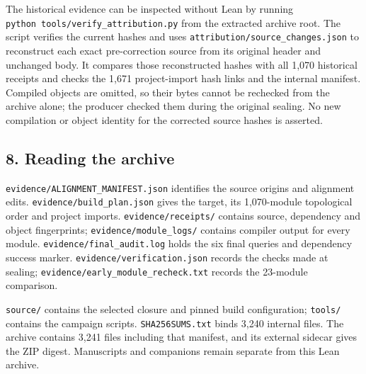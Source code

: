 \documentclass[english,11pt,a4paper]{article}
\begin{document}
The historical evidence can be inspected without Lean by running \texttt{python\ tools/\allowbreak{}verify\_\allowbreak{}attribution.\allowbreak{}py} from the extracted archive root. The script verifies the current hashes and uses \texttt{attribution/\allowbreak{}source\_\allowbreak{}changes.\allowbreak{}json} to reconstruct each exact pre-correction source from its original header and unchanged body. It compares those reconstructed hashes with all 1,070 historical receipts and checks the 1,671 project-import hash links and the internal manifest. Compiled objects are omitted, so their bytes cannot be rechecked from the archive alone; the producer checked them during the original sealing. No new compilation or object identity for the corrected source hashes is asserted.

\subsection{8. Reading the archive}\label{reading-the-archive}

\texttt{evidence/\allowbreak{}ALIGNMENT\_\allowbreak{}MANIFEST.\allowbreak{}json} identifies the source origins and alignment edits. \texttt{evidence/\allowbreak{}build\_\allowbreak{}plan.\allowbreak{}json} gives the target, its 1,070-module topological order and project imports. \texttt{evidence/\allowbreak{}receipts/\allowbreak{}} contains source, dependency and object fingerprints; \texttt{evidence/\allowbreak{}module\_\allowbreak{}logs/\allowbreak{}} contains compiler output for every module. \texttt{evidence/\allowbreak{}final\_\allowbreak{}audit.\allowbreak{}log} holds the six final queries and dependency success marker. \texttt{evidence/\allowbreak{}verification.\allowbreak{}json} records the checks made at sealing; \texttt{evidence/\allowbreak{}early\_\allowbreak{}module\_\allowbreak{}recheck.\allowbreak{}txt} records the 23-module comparison.

\texttt{source/\allowbreak{}} contains the selected closure and pinned build configuration; \texttt{tools/\allowbreak{}} contains the campaign scripts. \texttt{SHA256SUMS.\allowbreak{}txt} binds 3,240 internal files. The archive contains 3,241 files including that manifest, and its external sidecar gives the ZIP digest. Manuscripts and companions remain separate from this Lean archive.
\end{document}
